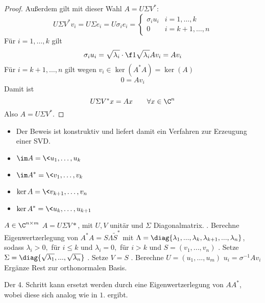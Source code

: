 \documentclass[11pt]{scrbook}
\begin{document}
\begin{st}
\begin{proof}
		Außerdem gilt mit dieser Wahl $A=U\Sigma V^*$:
		\[
			U\Sigma V^* v_i = U \Sigma e_i = U \sigma_i e_i = \begin{cases}
				\sigma_i u_i & i=1,\dotsc,k \\
				0 & i =k+1,\dotsc,n
			\end{cases}
		\]
		Für $i=1,\dotsc,k$ gilt
		\[
			\sigma_i u_i = \sqrt{\lambda_i} \cdot \f 1{\sqrt{\lambda_i}}Av_i = Av_i
		\]
		Für $i=k+1,\dotsc, n$ gilt wegen $v_i \in \ker (A^*A) = \ker (A)$
		\[
			0 = Av_i
		\]
		Damit ist
		\[
			U\Sigma V^* x = Ax \qquad \forall x\in \C^n
		\]
		Also $A= U\Sigma V^*$.
	\end{proof}
	\begin{note}
		\begin{itemize}
			\item
				Der Beweis ist konstruktiv und liefert damit ein Verfahren zur Erzeugung einer SVD.
			\item
				$\displaystyle \im A = \<u_1,\dotsc,u_k\>$
			\item
				$\displaystyle \im A^* = \<v_1,\dotsc, v_k\>$
			\item
				$\displaystyle \ker A = \<v_{k+1},\dotsc, v_n\>$
			\item
				$\displaystyle \ker A^* = \<u_k,\dotsc, u_{k+1}\>$
		\end{itemize}
	\end{note}
\end{st}
\begin{alg*}[SVD]
\begin{algorithmic}
\Assume $ A\in \C^{n\times m} $
\Ensure $ A=U\Sigma V*$, mit $ U,V $  unitär und $\Sigma$ Diagonalmatrix. 
. Berechne Eigenwertzerlegung von $ A^*A=S\Lambda \tilde{S}^* $ mit $ \Lambda=\diag\{\lambda_1,..., \lambda_k, \lambda_{k+1},...,\lambda_{n}\} $, sodass $ \lambda_i>0, $ für $ i\le k $ und $ \lambda_i=0, $ für $ i>k $ und $ S=(v_1,...,v_n) $
. Setze $ \Sigma=\diag{\sqrt{\lambda_1}, ..., \sqrt{\lambda_n}} $
. Setze $ V=S $
. Berechne $ U=(u_1,...,u_m) $
\State $ u_i=\sigma^{-1}Av_i $
\EndFor
\State Ergänze Rest zur orthonormalen Basis.
\end{algorithmic}
\end{alg*}
\begin{note*}
Der 4. Schritt kann ersetzt werden durch eine Eigenwertzerlegung von $ AA^* $, wobei diese sich analog wie in $ 1. $ ergibt.
\end{note*}
\end{document}
